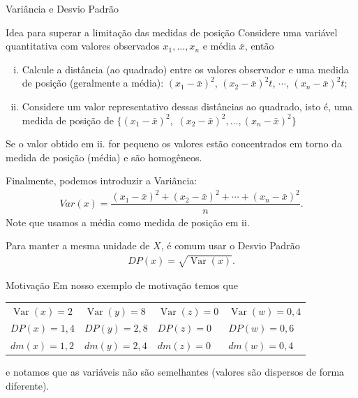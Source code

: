 \documentclass[8pt]{beamer}
\DeclareMathOperator{\vari}{Var}
\begin{document}
\begin{frame}{Variância e Desvio Padrão}

{\tiny
 \begin{block}{Idea para superar a limitação das medidas de posição}
 Considere uma variável quantitativa com valores observados $x_1, \dots, x_n$ e média $\bar{x}$, então
 \begin{enumerate}[i.]
  \item Calcule a distância (ao quadrado) entre os valores observador e uma medida de posição (geralmente a média): $\left( x_1 - \bar{x} \right)^2$, $\left( x_2 - \bar{x} \right)^2t$, $\cdots$, $\left( x_n - \bar{x} \right)^2t$;
  \item Considere um valor representativo dessas distâncias ao quadrado, isto é, uma medida de posição de $\{\left( x_1-\bar{x} \right)^2,$ $ \left( x_2-\bar{x} \right)^2, \dots, \left( x_n-\bar{x} \right)^2\}$ 
 \end{enumerate}
 {\color{magenta} Se o valor obtido em ii. for pequeno os valores estão concentrados em torno da medida de posição (média) e são homogêneos. } 
 
 Finalmente, podemos introduzir a Variância:
 \begin{align*}
  Var(x) = \dfrac{\left( x_1-\bar{x} \right)^2 + \left( x_2-\bar{x} \right)^2+\cdots+\left( x_n-\bar{x} \right)^2}{n}.
 \end{align*}
 Note que usamos a média como medida de posição em ii.
 
 Para manter a mesma unidade de $X$, é comum usar o Desvio Padrão
 \begin{align*}
  DP(x)  =\sqrt{ \vari(x)}.
 \end{align*}
 \end{block}  
 
 \begin{block}{Motivação}
  Em nosso exemplo de motivação temos que
  \begin{table}
   \centering
   \begin{tabular}{llll}
    $\vari(x) = 2$ & $\vari(y)=8$ & $\vari(z)=0$ & $\vari(w)=0,4 $\\
    $DP(x) = 1,4$ & $DP(y)=2,8$ & $DP(z)=0$ & $DP(w)=0,6 $\\
    $dm(x) = 1,2$ & $dm(y)=2,4$ & $dm(z)=0$ & $dm(w)=0,4$
   \end{tabular}
  \end{table}
  e notamos que as variáveis não são semelhantes (valores são dispersos de forma diferente).
 \end{block}

}
\end{frame}
\end{document}
